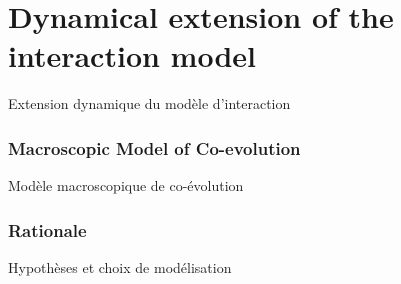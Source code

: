 




\newpage

\section[Interaction model][Modèle d'interaction]{Dynamical extension of the interaction model}{Extension dynamique du modèle d'interaction}






\subsubsection{Macroscopic Model of Co-evolution}{Modèle macroscopique de co-évolution}


\subsubsection{Rationale}{Hypothèses et choix de modélisation}


